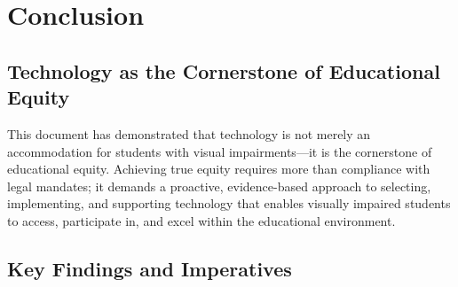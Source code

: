 \chapter{Conclusion}\label{main-conclusion}

\section{Technology as the Cornerstone of Educational Equity}
\label{sec:conclusion-technology-equity}

This document has demonstrated that technology is not merely an accommodation for students with visual impairments—it is the cornerstone of educational equity. Achieving true equity requires more than compliance with legal mandates; it demands a proactive, evidence-based approach to selecting, implementing, and supporting technology that enables visually impaired students to access, participate in, and excel within the educational environment. \cite{IntroductionChapter1}

\section{Key Findings and Imperatives}
\label{sec:conclusion-key-findings}

